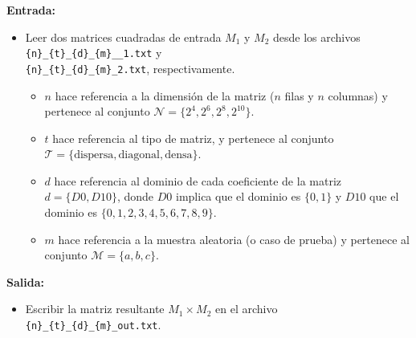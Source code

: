 \textbf{Entrada:}
\begin{itemize}
    \item Leer dos matrices cuadradas de entrada $M_1$ y $M_2$ desde los archivos \texttt{\{n\}\_\{t\}\_\{d\}\_\{m\}\_\_1.txt} y \\ 
    \texttt{\{n\}\_\{t\}\_\{d\}\_\{m\}\_2.txt}, respectivamente.
    \begin{itemize}
        \item $n$ hace referencia a la dimensión de la matriz ($n$ filas y $n$ columnas) y pertenece al conjunto $\mathcal{N} = \{2^4, 2^6, 2^8, 2^{10}\}$.
        \item $t$ hace referencia al tipo de matriz, y pertenece al conjunto $\mathcal{T} = \{ \text{dispersa}, \text{diagonal}, \text{densa} \}$.
        \item $d$ hace referencia al dominio de cada coeficiente de la matriz $d = \{D0, D10\}$, donde $D0$ implica que el dominio es $\{0,1\}$ y $D10$ que el dominio es $\{0,1,2,3,4,5,6,7,8,9\}$. 
        \item $m$ hace referencia a la muestra aleatoria (o caso de prueba) y pertenece al conjunto $\mathcal{M} = \{a,b,c\}$.
    \end{itemize}
\end{itemize}

\textbf{Salida:}
\begin{itemize}
    \item Escribir la matriz resultante $M_1 \times M_2$ en el archivo \texttt{\{n\}\_\{t\}\_\{d\}\_\{m\}\_out.txt}.
\end{itemize}


